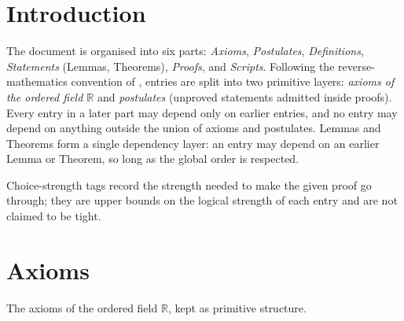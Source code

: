 \documentclass[11pt,reqno]{amsart}
\providecommand{\R}{\mathbb{R}}
\begin{document}
	
	\thispagestyle{empty} \newpage \pagestyle{plain} 
	
	\section{Introduction}
	\noindent The document is organised into six parts: \emph{Axioms},
	\emph{Postulates}, \emph{Definitions}, \emph{Statements} (Lemmas,
	Theorems), \emph{Proofs}, and \emph{Scripts}. Following the
	reverse-mathematics convention of \cite{simpson2009}, entries are split
	into two primitive layers: \emph{axioms of the ordered field $\R$} and
	\emph{postulates} (unproved statements admitted inside proofs). Every
	entry in a later part may depend only on earlier entries, and no entry
	may depend on anything outside the union of axioms and postulates.
	Lemmas and Theorems form a single dependency layer: an entry may depend
	on an earlier Lemma or Theorem, so long as the global order is respected.
	
	Choice-strength tags record the strength needed to make the given proof
	go through; they are upper bounds on the logical strength of each entry
	and are not claimed to be tight.
	
	\section{Axioms}
	\noindent The axioms of the ordered field $\R$, kept as primitive
	structure.
	
	\noindent \text{ \ } \newline
	
\end{document}
